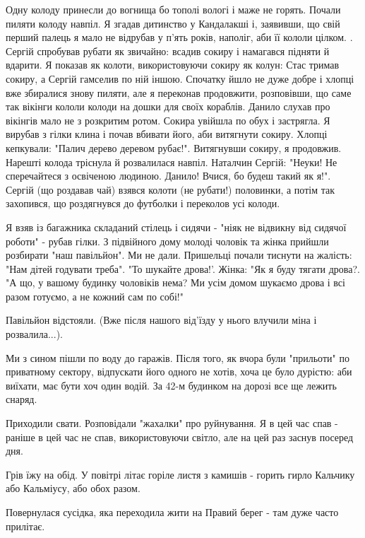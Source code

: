 Одну колоду принесли до вогнища бо тополі вологі і маже не горять. Почали
пиляти колоду навпіл. Я згадав дитинство у Кандалакші і, заявивши, що свій
перший палець я мало не відрубав у п'ять років, наполіг, аби її кололи цілком.
. Сергій спробував рубати як звичайно: всадив сокиру і намагався підняти й
вдарити. Я показав як колоти, використовуючи сокиру як колун: Стас тримав
сокиру, а Сергій гамселив по ній іншою. Спочатку йшло не дуже добре і хлопці
вже збиралися знову пиляти, але я переконав продовжити, розповівши, що саме так
вікінги кололи колоди на дошки для своїх кораблів. Данило слухав про вікінгів
мало не з розкритим ротом. Сокира увійшла по обух і застрягла. Я вирубав з
гілки клина і почав вбивати його, аби витягнути сокиру. Хлопці кепкували:
"Палич дерево деревом рубає!". Витягнувши сокиру, я продовжив. Нарешті колода
тріснула й розвалилася навпіл. Наталчин Сергій: "Неуки! Не сперечайтеся з
освіченою людиною. Данило! Вчися, бо будеш такий як я!". Сергій (що роздавав
чай) взявся колоти (не рубати!) половинки, а потім так захопився, що
роздягнувся до футболки і переколов усі колоди.


Я взяв із багажника складаний стілець і сидячи - "ніяк не відвикну від сидячої
роботи" -  рубав гілки. З підвійного дому молоді чоловік та жінка прийшли
розбирати "наш павільйон". Ми не дали. Пришельці почали тиснути на жалість:
"Нам дітей годувати треба". "То шукайте дрова!'. Жінка: "Як я буду тягати
дрова?. "А що, у вашому будинку чоловіків нема? Ми усім домом шукаємо дрова і
всі разом готуємо, а не кожний сам по собі!"

Павільйон відстояли. (Вже після нашого від'їзду у нього влучили міна і
розвалила...).

Ми з сином пішли по воду до гаражів. Після того, як вчора були "прильоти" по
приватному сектору, відпускати його одного не хотів, хоча це було дурістю: аби
виїхати, має бути хоч один водій. За 42-м будинком на дорозі все ще лежить
снаряд.

Приходили свати. Розповідали "жахалки" про руйнування. Я в цей час спав -
раніше в цей час не спав, використовуючи світло, але на цей раз заснув посеред
дня. 

Грів їжу на обід. У повітрі літає горіле листя з камишів - горить гирло
Кальчику або Кальміусу, або обох разом.

Повернулася сусідка, яка переходила жити на Правий берег - там дуже часто
прилітає.

